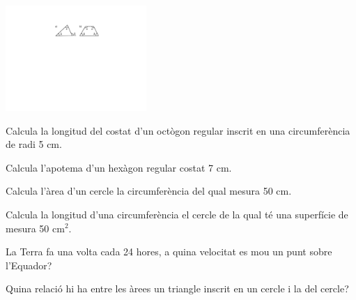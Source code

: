 \begin{activitats}
\begin{mylist}
\begin{center}
	\includegraphics[width=0.4\textwidth]{img-09/angles}
\end{center}

\redacta

\answers{[$\alpha= 180 - (A+180-B)=B-A$, $2A+2\alpha=360$; $\alpha=180-A$]}

\exer  Calcula la longitud del costat d'un octògon regular inscrit en una circumferència de radi 5 cm.


\exer  Calcula l'apotema d'un hexàgon regular costat 7 cm.

\exer  Calcula l'àrea d'un cercle la circumferència del qual mesura 50 cm.

\exer  Calcula la longitud d'una circumferència el cercle de la qual té una superfície de mesura 50 cm${}^{2}$.

\exer  La Terra fa una volta cada 24 hores, a quina velocitat es mou un punt sobre l'Equador?

\exer \hot Quina relació hi ha entre les àrees un triangle inscrit en un cercle i la del cercle?

\end{mylist}
\end{activitats}
